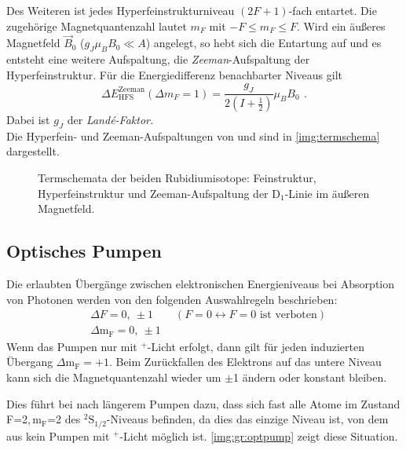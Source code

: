 Des Weiteren ist jedes Hyperfeinstrukturniveau $(2F+1)$-fach entartet. Die zugehörige Magnetquantenzahl lautet $m_F$ mit $-F \leq m_F \leq F$. 
Wird ein äußeres Magnetfeld $\vec{B}_0$ ($g_J \mu_B B_0 \ll A$) angelegt, so hebt sich die Entartung auf und es entsteht eine weitere 
Aufspaltung, die \emph{Zeeman}-Aufspaltung der Hyperfeinstruktur.
Für die Energiedifferenz benachbarter Niveaus gilt 
\begin{equation}
    \label{eq:nuclearspin}
    \Delta E_\text{HFS}^\text{Zeeman}(\Delta m_F = 1) = \frac{g_J}{2 \left( I + \frac{1}{2} \right) } \mu_B B_0 \ \, .
\end{equation}
Dabei ist $g_J$ der \emph{Landé-Faktor.}\\
Die Hyperfein- und Zeeman-Aufspaltungen von  und  sind in \autoref{img:termschema} dargestellt.

\begin{figure}[H]
    \centering
    \def\svgwidth{0.85\textwidth}
    
    \caption{Termschemata der beiden Rubidiumisotope:
    Feinstruktur, Hyperfeinstruktur und Zeeman-Aufspaltung der D$_1$-Linie im äußeren Magnetfeld.}
    \label{img:termschema}
\end{figure}

\subsection{Optisches Pumpen}
Die erlaubten Übergänge zwischen elektronischen Energieniveaus bei Absorption von Photonen
werden von den folgenden Auswahlregeln beschrieben:
\begin{equation}
\begin{split}
  & \Delta F = 0, \ \pm 1 \qquad (F = 0 \leftrightarrow F = 0 \text{ ist verboten}) \\
  & \Delta \text{m}_\text{F} = 0, \ \pm 1
  \end{split}
\end{equation}
Wenn das Pumpen nur mit \textsigma$^+$-Licht erfolgt,
dann gilt für jeden induzierten Übergang \mbox{$\Delta \text{m}_\text{F} = +1$}.
Beim Zurückfallen des Elektrons auf das untere Niveau kann sich die Mag\-net\-quan\-ten\-zahl
wieder um $\pm$1 ändern oder konstant bleiben.

Dies führt bei  nach längerem Pumpen dazu, dass sich fast alle Atome im Zustand
F=2,\,$\text{m}_\text{F}$=2 des \mbox{${}^2\text{S}_{1/2}$-Niveaus} befinden,
da dies das einzige Niveau ist, von dem aus kein Pumpen mit \textsigma$^+$-Licht möglich ist.
\autoref{img:gr:optpump} zeigt diese Situation.

